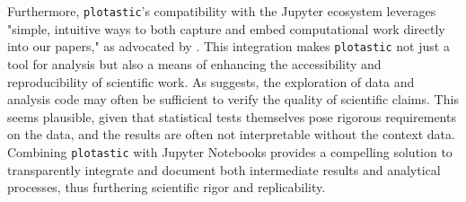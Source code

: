 Furthermore, \texttt{plotastic}'s compatibility with the Jupyter ecosystem
leverages "simple, intuitive ways to both capture and embed computational work
directly into our papers," as advocated by
\citet{mesirovAccessibleReproducibleResearch2010}. This integration makes
\texttt{plotastic} not just a tool for analysis but also a means of enhancing
the accessibility and reproducibility of scientific work. As
\citet{pengReproducibleResearchComputational2011} suggests, the exploration of
data and analysis code may often be sufficient to verify the quality of
scientific claims. This seems plausible, given that statistical tests themselves
pose rigorous requirements on the data, and the results are often not
interpretable without the context data. Combining \texttt{plotastic} with
Jupyter Notebooks provides a compelling solution to transparently integrate and
document both intermediate results and analytical processes, thus furthering
scientific rigor and replicability.












